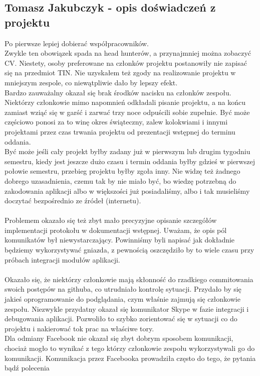 \documentclass[10pt,a4paper]{article}
\begin{document}
        \subsection{Tomasz Jakubczyk - opis doświadczeń z projektu}
Po pierwsze lepiej dobierać współpracowników. \\
Zwykle ten obowiązek spada na head hunterów, a przynajmniej można zobaczyć CV. Niestety, osoby preferowane na członków projektu postanowiły nie zapisać się na przedmiot TIN. Nie uzyskałem też zgody na realizowanie projektu w mniejszym zespole, co niewątpliwie dało by lepszy efekt. \\
Bardzo zauważalny okazał się brak środków nacisku na członków zespołu. Niektórzy członkowie mimo napomnień odkładali pisanie projektu, a na końcu zamiast wziąć się w garść i zarwać trzy noce odpuścili sobie zupełnie. Być może częściowo ponosi za to winę okres świąteczny, zalew kolokwiami i innymi projektami przez czas trwania projektu od prezentacji wstępnej do terminu oddania. \\
Być może jeśli cały projekt byłby zadany już w pierwszym lub drugim tygodniu semestru, kiedy jest jeszcze dużo czasu i termin oddania byłby gdzieś w pierwszej połowie semestru, przebieg projektu byłby zgoła inny. Nie widzę też żadnego dobrego uzasadnienia, czemu tak by nie miało być, bo wiedzę potrzebną do zakodowania aplikacji albo w większości już posiadaliśmy, albo i tak musieliśmy doczytać bezpośrednio ze źródeł (internetu). \\ \\
Problemem okazało się też zbyt mało precyzyjne opisanie szczegółów implementacji protokołu w dokumentacji wstępnej. Uważam, że opis pól komunikatów był niewystarczający. Powinniśmy byli napisać jak dokładnie będziemy wykorzystywać gniazda, z pewnością oszczędziło by to wiele czasu przy próbach integracji modułów aplikacji. \\ \\
Okazało się, że niektórzy członkowie mają skłonność do rzadkiego commitowania swoich postępów na githuba, co utrudniało kontrolę sytuacji. Przydało by się jakieś oprogramowanie do podglądania, czym właśnie zajmują się członkowie zespołu.
Niezwykle przydatny okazał się komunikator Skype w fazie integracji i debugowania aplikacji. Pozwoliło to szybko zorientować się w sytuacji co do projektu i nakierować tok prac na właściwe tory. \\
Dla odmiany Facebook nie okazał się zbyt dobrym sposobem komunikacji, chociaż mogło to wynikać z tego którzy członkowie zespołu wykorzystywali go do komunikacji. Komunikacja przez Facebooka prowadziła często do tego, że pytania bądź polecenia
\end{document}
